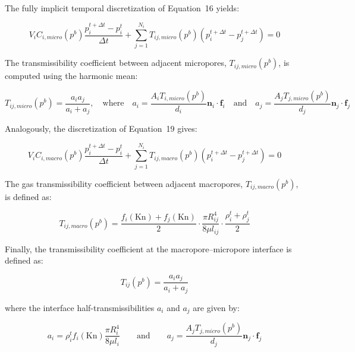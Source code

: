 \documentclass{article}
\begin{document}
The fully implicit temporal discretization of Equation~16 yields:

\begin{equation}
    V_{i} C_{i,micro}\left(p^{b}\right) \frac{p_{i}^{t+\Delta t}-p_i^{t}}{\Delta t}+\sum_{j=1}^{N_{i}} T_{ij,micro}\left(p^{b}\right)\left(p_{i}^{t+\Delta t}-p_{j}^{t+\Delta t}\right)=0
\end{equation}

The transmissibility coefficient between adjacent micropores, $T_{ij,micro}\left(p^{b}\right)$, is computed using the harmonic mean:

\begin{equation}
    T_{ij,micro}\left(p^{b}\right)=\frac{a_{i} a_{j}}{a_{i}+a_{j}}, \quad \text{where} \quad a_{i}=\frac{A_{i} T_{i,micro}\left(p^{b}\right)}{d_{i}} \mathbf{n}_{i} \cdot \mathbf{f}_{i} \quad \text{and} \quad a_{j}=\frac{A_{j} T_{j,micro}\left(p^{b}\right)}{d_{j}} \mathbf{n}_{j} \cdot \mathbf{f}_{j}
\end{equation}

Analogously, the discretization of Equation~19 gives:

\begin{equation}
    V_{i} C_{i,macro}\left(p^{b}\right) \frac{p_{i}^{t+\Delta t}-p_i^{t}}{\Delta t}+\sum_{j=1}^{N_{i}} T_{ij,macro}\left(p^{b}\right)\left(p_{i}^{t+\Delta t}-p_{j}^{t+\Delta t}\right)=0
\end{equation}

The gas transmissibility coefficient between adjacent macropores, $T_{ij,macro}\left(p^{b}\right)$, is defined as:

\begin{equation}
    T_{ij,macro}\left(p^{b}\right)=\frac{f_{i}(\mathrm{Kn})+f_{j}(\mathrm{Kn})}{2} \cdot \frac{\pi R_{ij}^{4}}{8 \mu l_{ij}} \cdot \frac{\rho_{i}^{t}+\rho_{j}^{t}}{2}
\end{equation}

Finally, the transmissibility coefficient at the macropore--micropore interface is defined as:

\begin{equation}
    T_{ij}\left(p^{b}\right)=\frac{a_{i} a_{j}}{a_{i}+a_{j}}
\end{equation}

where the interface half-transmissibilities $a_i$ and $a_j$ are given by:

\begin{equation}
    a_{i}=\rho_{i}^{t} f_{i}(\mathrm{Kn}) \frac{\pi R_{i}^{4}}{8 \mu l_{i}} \qquad \text{and} \qquad a_{j}=\frac{A_{j} T_{j,micro}\left(p^{b}\right)}{d_{j}} \mathbf{n}_{j} \cdot \mathbf{f}_{j}
\end{equation}
\end{document}
